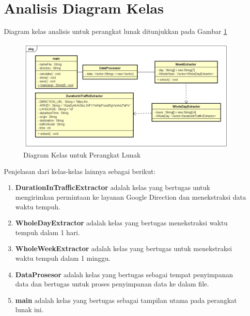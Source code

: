 \section{Analisis Diagram Kelas}
\label{sec:analisisclassdiagram}

Diagram kelas analisis untuk perangkat lunak ditunjukkan pada Gambar \ref{fig:classdiagramawal}

\begin{figure}[H]
				\centering		
				\includegraphics[scale=0.4]{Gambar/ClassDiagram.png}
				\caption[Diagram Kelas untuk Perangkat Lunak]{Diagram Kelas untuk Perangkat Lunak}
				\label{fig:classdiagramawal}	
			\end{figure}
Penjelasan dari kelas-kelas lainnya sebagai berikut:
\begin{enumerate}
	\item \textbf{DurationInTrafficExtractor} adalah kelas yang bertugas untuk mengirimkan permintaan ke layanan Google Direction dan menekstraksi data waktu tempuh.
	\item \textbf{WholeDayExtractor} adalah kelas yang bertugas menekstraksi waktu tempuh dalam 1 hari.
	\item \textbf{WholeWeekExtractor} adalah kelas yang bertugas untuk menekstraksi waktu tempuh dalam 1 minggu.
	\item \textbf{DataProsesor} adalah kelas yang bertugas sebagai tempat penyimpanan data dan bertugas untuk proses penyimpanan data ke dalam file.
	\item \textbf{main} adalah kelas yang bertugas sebagai tampilan utama pada perangkat lunak ini.
\end{enumerate}